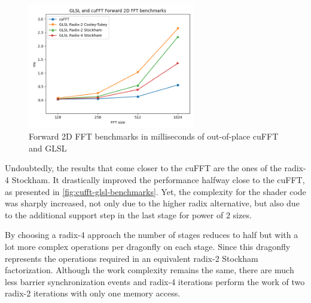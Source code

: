 \documentclass[
  oneside,
  11pt, a4paper,
  footinclude=true,
  headinclude=true,
  cleardoublepage=empty
]{scrbook}
\begin{document}

\begin{figure}[h!] 
    \centering
    \includegraphics[width=0.65\textwidth]{img/results/cufft_glsl_benchmarks.png}
    \caption{Forward 2D FFT benchmarks in milliseconds of out-of-place cuFFT and GLSL}
    \label{fig:cufft-glsl-benchmarks}
\end{figure}

Undoubtedly, the results that come closer to the cuFFT are the ones of the radix-4 Stockham. It drastically improved the performance halfway close to the cuFFT, as presented in \autoref{fig:cufft-glsl-benchmarks}. Yet, the complexity for the shader code was sharply increased, not only due to the higher radix alternative, but also due to the additional support step in the last stage for power of $2$ sizes.

By choosing a radix-4 approach the number of stages reduces to half but with a lot more complex operations per dragonfly on each stage. Since this dragonfly represents the operations required in an equivalent radix-2 Stockham factorization. Although the work complexity remains the same, there are much less barrier synchronization events and radix-4 iterations perform the work of two radix-2 iterations with only one memory access.
\end{document}
